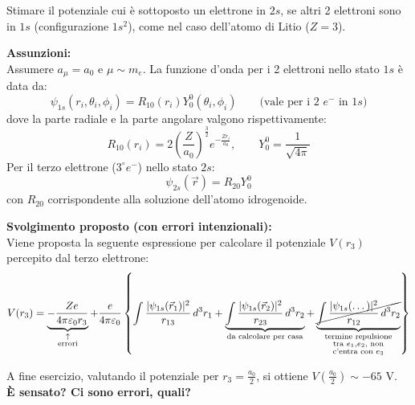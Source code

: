 \begin{exercise}
    Stimare il potenziale cui è sottoposto un elettrone in \( 2s \), se altri 2 elettroni sono in \( 1s \) (configurazione \( 1s^2 \)), come nel caso dell'atomo di Litio (\( Z=3 \)).

    \textbf{Assunzioni:} \\
    Assumere \( a_\mu = a_0 \) e \( \mu \sim m_e \). La funzione d'onda per i 2 elettroni nello stato \( 1s \) è data da:
    \begin{equation}
        \psi_{1s}(r_i, \theta_i, \phi_i) = R_{10}(r_i) Y_0^0(\theta_i, \phi_i) \qquad \text{(vale per i 2 } e^- \text{ in } 1s)
    \end{equation}
    dove la parte radiale e la parte angolare valgono rispettivamente:
    \begin{equation}
        R_{10}(r_i) = 2 \left( \frac{Z}{a_0} \right)^{\frac{3}{2}} e^{-\frac{Z r_i}{a_0}}, \qquad Y_0^0 = \frac{1}{\sqrt{4\pi}}
    \end{equation}
    Per il terzo elettrone (\( 3^\circ e^- \)) nello stato \( 2s \):
    \begin{equation}
        \psi_{2s}(\vec{r}) = R_{20} Y_0^0
    \end{equation}
    con \( R_{20} \) corrispondente alla soluzione dell'atomo idrogenoide.

    \textbf{Svolgimento proposto (con errori intenzionali):}\\
    Viene proposta la seguente espressione per calcolare il potenziale \( V(r_3) \) percepito dal terzo elettrone:
    \begin{equation}
        V(r_3) = \underbrace{-\frac{Ze}{4\pi\varepsilon_0 r_3}}_{\substack{\uparrow \\ \text{errori}}} + \frac{e}{4\pi\varepsilon_0} \left\{ \int \frac{|\psi_{1s}(\vec{r}_1)|^2}{r_{13}} \, d^3r_1 + \underbrace{\int \frac{|\psi_{1s}(\vec{r}_2)|^2}{r_{23}} \, d^3r_2}_{\text{da calcolare per casa}} + \underbrace{\cancel{\int \frac{|\psi_{1s}(\dots)|^2}{r_{12}} \, d^3r_2}}_{\substack{\text{termine repulsione} \\ \text{tra } e_1, e_2 \text{, non} \\ \text{c'entra con } e_3}} \right\}
    \end{equation}
    
    A fine esercizio, valutando il potenziale per \( r_3 = \frac{a_0}{2} \), si ottiene \( V\left(\frac{a_0}{2}\right) \sim -65 \text{ V} \). \\
    \textbf{È sensato? Ci sono errori, quali?}


\end{exercise}
